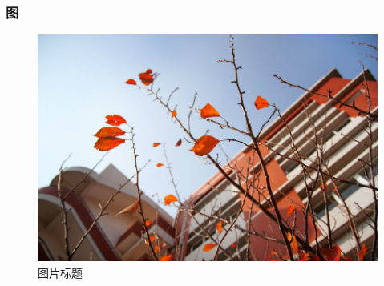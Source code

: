 \documentclass{ctexbeamer}
\begin{document}
\begin{frame}
  \frametitle{图}
  \begin{figure}
    \centering
    \begin{stampbox}
      \includegraphics[height = 0.3\textheight]
      {../plant.jpg}
    \end{stampbox}
    \caption{图片标题}
  \end{figure}
\end{frame}
\end{document}

